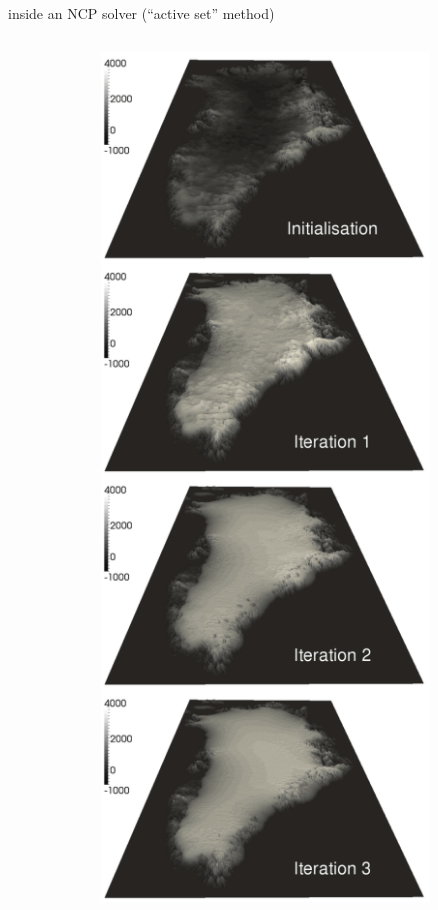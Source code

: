 \documentclass[10pt,hyperref,dvipsnames]{beamer}
\begin{document}
\begin{frame}{inside an NCP solver (``active set'' method)}
\begin{columns}
\begin{column}{0.7\textwidth}
\begin{itemize}
\end{itemize}
\end{column}
\begin{column}{0.3\textwidth}
\hfill \includegraphics[width=0.8\textwidth]{figs/GISsequence.png} \hfill
\end{column}
\end{columns}
\end{frame}
\end{document}
